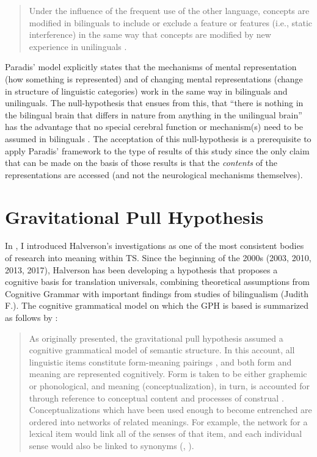 \begin{quote}
Under the influence of the frequent use of the other language, concepts are modified in bilinguals to include or exclude a feature or features (i.e., static interference) in the same way that concepts are modified by new experience in unilinguals \citep[11]{kecskes_neurofunctional_2007}.
\end{quote}

Paradis’ model explicitly states that the mechanisms of mental representation (how something is represented) and of changing mental representations (change in structure of linguistic categories) work in the same way in bilinguals and unilinguals. The null-hypothesis that ensues from this, that “there is nothing in the bilingual brain that differs in nature from anything in the unilingual brain” \citep[189]{paradis_neurolinguistic_2004} has the advantage that no special cerebral function or mechanism(s) need to be assumed in bilinguals \citep[26]{kecskes_neurofunctional_2007}. The acceptation of this null-hypothesis is a prerequisite to apply Paradis’ framework to the type of results of this study since the only claim that can be made on the basis of those results is that the \textit{contents} of the representations are accessed (and not the neurological mechanisms themselves).

\section{Gravitational Pull Hypothesis}
\label{sec:5.2}  
In , I introduced Halverson’s investigations as one of the most consistent bodies of research into meaning within TS. Since the beginning of the 2000s (2003, 2010, 2013, 2017), Halverson has been developing a hypothesis that proposes a cognitive basis for translation universals, combining theoretical assumptions from Cognitive Grammar with important findings from studies of bilingualism \citep{heredia_bilingual_2014,jarvis_crosslinguistic_2008,kroll_category_1994} (Judith F.). The cognitive grammatical model on which the GPH is based is summarized as follows by \citet[12]{de_sutter_developing_2017}:

\begin{quote}
As originally presented, the gravitational pull hypothesis assumed a cognitive grammatical model of semantic structure. In this account, all linguistic items constitute form-meaning pairings \citep[76]{langacker_foundations_1987}, and both form and meaning are represented cognitively. Form is taken to be either graphemic or phonological, and meaning (conceptualization), in turn, is accounted for through reference to conceptual content and processes of construal \citep[99-146]{langacker_foundations_1987}. Conceptualizations which have been used enough to become entrenched are ordered into networks of related meanings. For example, the network for a lexical item would link all of the senses of that item, and each individual sense would also be linked to synonyms (\citealt[385]{langacker_foundations_1987}, \citealt[27-54]{langacker_cognitive_2008}).
\end{quote}

